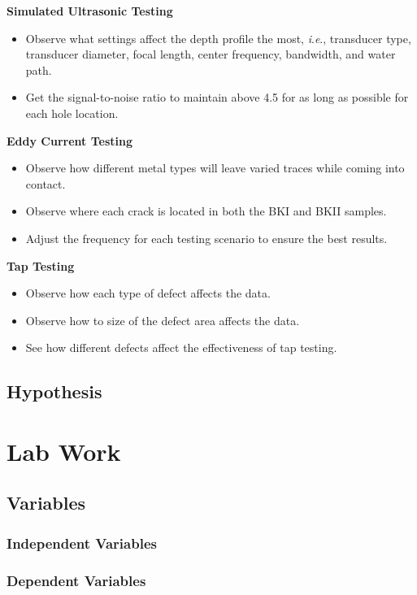 \documentclass[12 pt]{report}
\newcommand{\ie}{\textit{i}.\textit{e}., }
\begin{document}
\textbf{Simulated Ultrasonic Testing}
\begin{itemize}
	\item Observe what settings affect the depth profile the most, \ie transducer type, transducer diameter, focal length, center frequency, bandwidth, and water path.
	\item Get the signal-to-noise ratio to maintain above \num{4.5} for as long as possible for each hole location.
\end{itemize}     

\textbf{Eddy Current Testing}
\begin{itemize}
	\item Observe how different metal types will leave varied traces while coming into contact.
	\item Observe where each crack is located in both the BKI and BKII samples.
	\item Adjust the frequency for each testing scenario to ensure the best results.
\end{itemize}

\textbf{Tap Testing}
\begin{itemize}
	\item Observe how each type of defect affects the data.
	\item Observe how to size of the defect area affects the data.
	\item See how different defects affect the effectiveness of tap testing.
\end{itemize}

\section{Hypothesis} \label{hypothesis}

\chapter{Lab Work} \label{lab_work}
\section{Variables} \label{variables}
\subsection{Independent Variables} \label{variables-independent_variables}

\subsection{Dependent Variables} \label{variables-dependent_variables}
\end{document}
